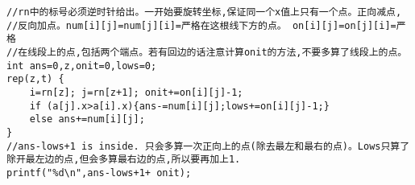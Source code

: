 \begin{lstlisting}
//rn中的标号必须逆时针给出。一开始要旋转坐标,保证同一个x值上只有一个点。正向减点,
//反向加点。num[i][j]=num[j][i]=严格在这根线下方的点。 on[i][j]=on[j][i]=严格
//在线段上的点,包括两个端点。若有回边的话注意计算onit的方法,不要多算了线段上的点。
int ans=0,z,onit=0,lows=0;
rep(z,t) {
	i=rn[z]; j=rn[z+1]; onit+=on[i][j]-1;
	if (a[j].x>a[i].x){ans-=num[i][j];lows+=on[i][j]-1;}
	else ans+=num[i][j];
}
//ans-lows+1 is inside. 只会多算一次正向上的点(除去最左和最右的点)。Lows只算了除开最左边的点,但会多算最右边的点,所以要再加上1.
printf("%d\n",ans-lows+1+ onit);
\end{lstlisting}
